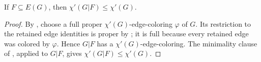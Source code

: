 \begin{lemma}
If $F\subseteq E(G)$, then
$\chi'(G|F)\le\chi'(G)$.
\end{lemma}
\begin{proof}
By , choose a full proper
$\chi'(G)$-edge-coloring $\varphi$ of $G$.  Its restriction to the retained
edge identities is proper by ; it is full
because every retained edge was colored by $\varphi$.  Hence $G|F$ has a
$\chi'(G)$-edge-coloring.  The minimality clause of
, applied to $G|F$, gives
$\chi'(G|F)\le\chi'(G)$.
\end{proof}
